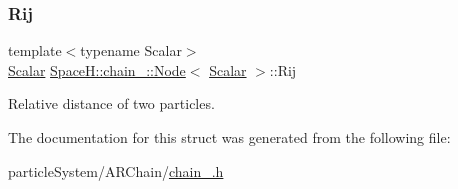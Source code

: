 \subsubsection{\texorpdfstring{Rij}{Rij}}
{\footnotesize\ttfamily template$<$typename Scalar$>$ \\
\mbox{\hyperlink{create_kepler_8cpp_a8c2981f3f834be9448a6ab06c28748eb}{Scalar}} \mbox{\hyperlink{struct_space_h_1_1chain_1_1_node}{Space\+H\+::chain_\+::\+Node}}$<$ \mbox{\hyperlink{create_kepler_8cpp_a8c2981f3f834be9448a6ab06c28748eb}{Scalar}} $>$\+::Rij}

Relative distance of two particles. 

The documentation for this struct was generated from the following file\+:\begin{DoxyCompactItemize}
\item 
particle\+System/\+A\+R\+Chain/\mbox{\hyperlink{chain_8h}{chain_.\+h}}\end{DoxyCompactItemize}
